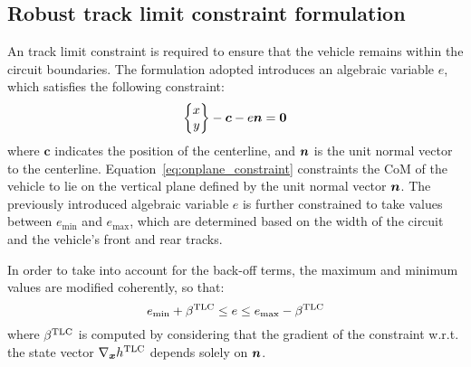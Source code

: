 \subsection{Robust track limit constraint formulation}
\label{sec:TLC}
An track limit constraint is required to ensure that the vehicle remains within the circuit boundaries. The formulation adopted introduces an algebraic variable $e$, which satisfies the following constraint:
\begin{equation}
	\begin{Bmatrix}
		x\\y
	\end{Bmatrix}
	-\boldsymbol{c} - e\bn=\boldsymbol{0} \label{eq:onplane_constraint}
\end{equation}
where $\boldsymbol{c}$ indicates the position of the centerline, and $\boldsymbol{n}$ is the unit normal vector to the centerline. Equation~\eqref{eq:onplane_constraint} constraints the CoM of the vehicle to lie on the vertical plane defined by the unit normal vector $\boldsymbol{n}$. The previously introduced algebraic variable $e$ is further constrained to take values between $e_\textrm{min}$ and $e_\textrm{max}$, which are determined based on the width of the circuit and the vehicle's front and rear tracks.

In order to take into account for the back-off terms, the maximum and minimum values are modified coherently, so that:
\begin{equation}
	e_\textrm{min} + \be^\textrm{TLC} \leq e \leq e_\textrm{max} - \be^\textrm{TLC}\label{eq:TLC}
\end{equation}
where $\beta^\textrm{TLC}$ is computed by considering that the gradient of the constraint w.r.t. the state vector $\nabla_{\boldsymbol{x}}h^\textrm{TLC}$ depends solely on $\boldsymbol{n}$.
